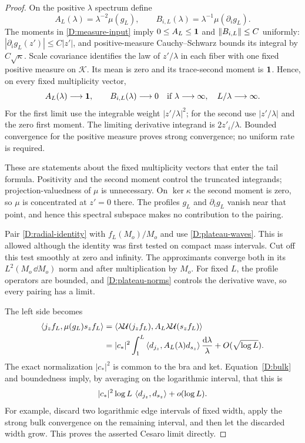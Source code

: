\begin{proof}
On the positive $\lambda$ spectrum define
\[
 A_L(\lambda)=\lambda^{-2}\mu(g_L),\qquad
 B_{i,L}(\lambda)=\lambda^{-1}\mu(\partial_i g_L).
\]
The moments in \eqref{D:measure-input} imply
$0\leq A_L\leq\mathbf 1$ and $\left\lVert B_{i,L}\right\rVert\leq C$ uniformly:
$|\partial_i g_L(z')|\leq C|z'|$, and positive-measure
Cauchy--Schwarz bounds its integral by $C\sqrt\kappa$.
Scale covariance identifies the law of $z'/\lambda$ in each
fiber with one fixed positive measure on $\mathcal K$.  Its
mean is zero and its trace-second moment is $\mathbf 1$.  Hence,
on every fixed multiplicity vector,
\begin{equation}\label{D:bulk}
 A_L(\lambda)\longrightarrow\mathbf 1,\qquad
 B_{i,L}(\lambda)\longrightarrow0
 \quad\text{if }\lambda\longrightarrow\infty,
 \quad L/\lambda\longrightarrow\infty.
\end{equation}
For the first limit use the integrable weight $|z'/\lambda|^2$;
for the second use $|z'/\lambda|$ and the zero first moment.
The limiting derivative integrand is $2z'_i/\lambda$.
Bounded convergence for the positive measure proves strong
convergence; no uniform rate is required.

These are statements about the fixed multiplicity vectors that enter
the tail formula.  Positivity and the second moment control the
truncated integrands; projection-valuedness of $\mu$ is unnecessary.
On $\ker\kappa$ the second moment is zero, so $\mu$ is concentrated at
$z'=0$ there.  The profiles $g_L$ and $\partial_i g_L$ vanish near that
point, and hence this spectral subspace makes no contribution to the
pairing.

Pair \eqref{D:radial-identity} with $f_L(M_o)/M_o$ and use
\eqref{D:plateau-waves}.  This is allowed although the identity
was first tested on compact mass intervals.  Cut off this test
smoothly at zero and infinity.  The approximants converge both
in its $L^2(M_o\,\dd M_o)$ norm and after multiplication by
$M_o$.  For fixed $L$, the profile operators are bounded, and
\eqref{D:plateau-norms} controls the derivative wave, so every
pairing has a limit.

The left side becomes
\begin{align*}
 \left\langle j_zf_L,\mu(g_L)s_zf_L\right\rangle
 &=\left\langle\lambda\mathcal U(j_zf_L),A_L\lambda\mathcal U(s_zf_L)\right\rangle\\
 &=|c_*|^2\int_1^L
 \left\langle d_{j_z},A_L(\lambda)d_{s_z}\right\rangle\frac{\mathrm d\lambda}{\lambda}
 +O(\sqrt{\log L}).
\end{align*}
The exact normalization $|c_*|^2$ is common to the bra and ket.
Equation~\eqref{D:bulk} and boundedness imply, by averaging on
the logarithmic interval, that this is
\begin{equation}\label{D:leading-pairing}
 |c_*|^2\log L\,\left\langle d_{j_z},d_{s_z}\right\rangle+o(\log L).
\end{equation}
For example, discard two logarithmic edge intervals of fixed
width, apply the strong bulk convergence on the remaining
interval, and then let the discarded width grow.  This proves
the asserted Cesaro limit directly.


\end{proof}
